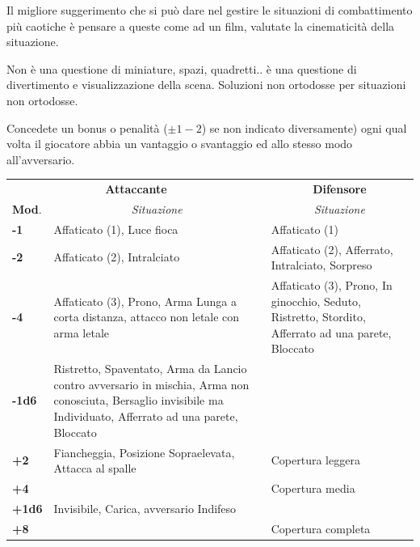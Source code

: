\begin{multicols}{2}
Il migliore suggerimento che si può dare nel gestire le situazioni di combattimento più caotiche è pensare a queste come ad un film, valutate la cinematicità della situazione.

Non è una questione di miniature, spazi, quadretti.. è una questione di divertimento e visualizzazione della scena. Soluzioni non ortodosse per situazioni non ortodosse.

Concedete un bonus o penalità ($\pm 1-2$) se non indicato diversamente) ogni qual volta il giocatore abbia un vantaggio o svantaggio ed allo stesso modo all'avversario.

\medskip

\end{multicols}

\noindent\begin{tabularx}{0.98\textwidth}{l|X|X}
\multicolumn{2}{c}{\textbf{Attaccante}}&\multicolumn{1}{c}{\textbf{Difensore}}\\
\textbf{Mod}.&\multicolumn{1}{c}{\emph{Situazione}}&\multicolumn{1}{c}{\emph{Situazione}}\\
\toprule
\textbf{-1}& Affaticato (1), Luce fioca&Affaticato (1)\\
\hline
\textbf{-2}& Affaticato (2), Intralciato & Affaticato (2), Afferrato, Intralciato, Sorpreso\\
\hline
\textbf{-4}& Affaticato (3), Prono, Arma Lunga a corta distanza, attacco non letale con arma letale& Affaticato (3), Prono, In ginocchio, Seduto, Ristretto, Stordito, Afferrato ad una parete, Bloccato\\
\hline
\textbf{-1d6}& Ristretto, Spaventato, Arma da Lancio contro avversario in mischia, Arma non conosciuta, Bersaglio invisibile ma Individuato, Afferrato ad una parete, Bloccato&\\
\hline
\textbf{+2}& Fiancheggia, Posizione Sopraelevata, Attacca al spalle& Copertura leggera\\
\hline
\textbf{+4}&& Copertura media\\
\hline
\textbf{+1d6}& Invisibile, Carica, avversario Indifeso& \\
\hline
\textbf{+8}&& Copertura completa
\end{tabularx}

\medskip

